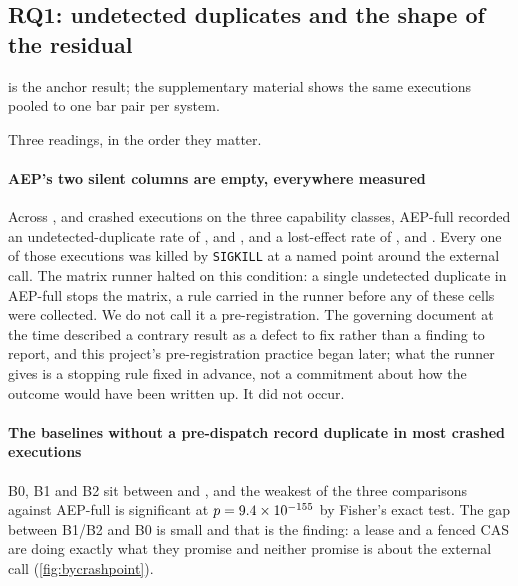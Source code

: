 \subsection{RQ1: undetected duplicates and the shape of the residual}
\label{sec:eval-rq1}

 is the anchor result; the supplementary material shows the
same executions pooled to one bar pair per system.



Three readings, in the order they matter.

\paragraph{AEP's two silent columns are empty, everywhere measured} Across
\AepExecAuth{}, \AepExecPosOnly{} and \AepExecNoReadback{} crashed executions on
the three capability classes, AEP-full recorded an undetected-duplicate rate of
\AepDupAuth{}, \AepDupPosOnly{} and \AepDupNoReadback{}, and a lost-effect rate
of \AepLostAuth{}, \AepLostPosOnly{} and \AepLostNoReadback{}. Every one of
those executions was killed by \texttt{SIGKILL} at a named point around the
external call. The matrix runner halted on this condition: a single undetected
duplicate in AEP-full stops the matrix, a rule carried in the runner before any
of these cells were collected. We do not call it a pre-registration. The
governing document at the time described a contrary result as a defect to fix
rather than a finding to report, and this project's pre-registration practice
began later; what the runner gives is a stopping rule fixed in advance, not a
commitment about how the outcome would have been written up. It did not occur.

\paragraph{The baselines without a pre-dispatch record duplicate in most
crashed executions} B0, B1 and B2 sit between \BaselineDupLow{} and
\BaselineDupHigh{}, and the weakest of the three comparisons against AEP-full
is significant at $p = 9.4\times10^{-155}{}$ by Fisher's exact test.
The gap between B1/B2 and B0 is small and that is the finding: a lease and a
fenced CAS are doing exactly what they promise and neither promise is about the
external call (\cref{fig:bycrashpoint}).

